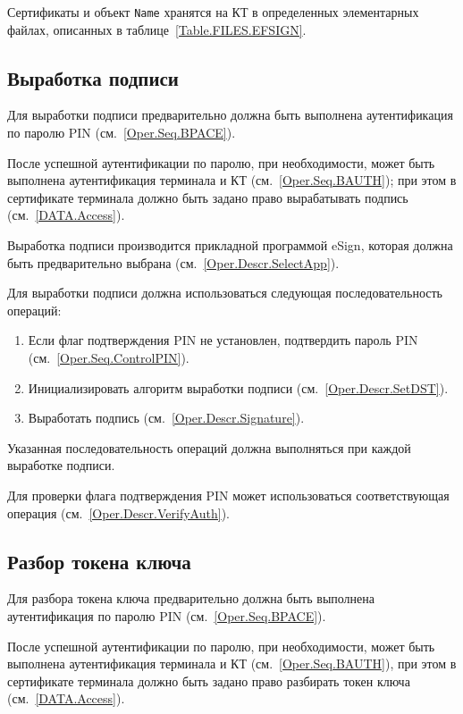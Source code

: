 Сертификаты и объект \texttt{Name} 
хранятся на КТ в определенных элементарных файлах, 
описанных в таблице~\ref{Table.FILES.EFSIGN}.

\subsection{Выработка подписи}
\label{Oper.Seq.Sig}

Для выработки подписи предварительно 
должна быть выполнена аутентификация по 
паролю PIN (см.~\ref{Oper.Seq.BPACE}).

После успешной аутентификации по паролю,
при необходимости, может быть выполнена 
аутентификация терминала и КТ (см.~\ref{Oper.Seq.BAUTH});
при этом в сертификате терминала должно быть задано право
вырабатывать подпись (см.~\ref{DATA.Access}).

Выработка подписи производится прикладной программой eSign, которая
должна быть предварительно выбрана (см.~\ref{Oper.Descr.SelectApp}).

Для выработки подписи  должна использоваться 
следующая последовательность операций:
%
\begin{enumerate}
\item Если флаг подтверждения PIN не установлен,
      подтвердить пароль PIN (см.~\ref{Oper.Seq.ControlPIN}).
\item Инициализировать алгоритм выработки подписи (см.~\ref{Oper.Descr.SetDST}).
\item Выработать подпись (см.~\ref{Oper.Descr.Signature}).
\end{enumerate}
%
Указанная последовательность операций должна выполняться
при каждой выработке подписи.

Для проверки флага подтверждения PIN может использоваться 
соответствующая операция (см.~\ref{Oper.Descr.VerifyAuth}).

\subsection{Разбор токена ключа}
\label{Oper.Seq.Decipher}

Для разбора токена ключа предварительно 
должна быть выполнена аутентификация по 
паролю PIN (см.~\ref{Oper.Seq.BPACE}).

После успешной аутентификации по паролю,
при необходимости, может быть выполнена аутентификация 
терминала и КТ (см.~\ref{Oper.Seq.BAUTH}),
при этом в сертификате терминала должно быть задано право
разбирать токен ключа (см.~\ref{DATA.Access}).

